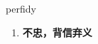 
\begin{frame}
{\huge perfidy}
\begin{center}
\begin{enumerate}\Large
  \item \textbf{不忠，背信弃义}
\end{enumerate}
\end{center}
\end{frame}
